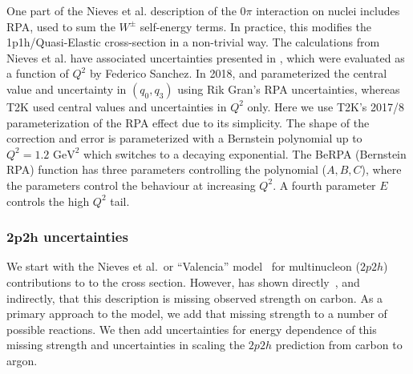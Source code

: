 One part of the Nieves et al.\cite{nieves1,nieves2} description of the $0\pi$ interaction on nuclei includes RPA, used to sum the $W^\pm$ self-energy terms. In practice, this modifies the 1p1h/Quasi-Elastic cross-section in a non-trivial way. The calculations from Nieves et al. have associated uncertainties presented in \cite{nieves_uncert}, which were evaluated as a function of $Q^2$ by Federico Sanchez. In 2018, \minerva and \nova parameterized the central value and uncertainty in $(q_0, q_3)$ using Rik Gran's RPA uncertainties\cite{RikRPA}, whereas T2K used central values and uncertainties in $Q^2$ only. Here we use T2K's 2017/8 parameterization of the RPA effect\cite{t2k_2018} due to its simplicity. The shape of the correction and error is parameterized with a Bernstein polynomial up to $Q^2=1.2\text{ GeV}^2$ which switches to a decaying exponential. The BeRPA (Bernstein RPA) function has three parameters controlling the polynomial ($A, B, C$), where the parameters control the behaviour at increasing $Q^2$. A fourth parameter $E$ controls the high $Q^2$ tail.

\subsubsection{$\boldsymbol{2p2h}$ uncertainties}
We start with the Nieves et al.\ or ``Valencia'' model~\cite{nieves1,nieves2} for multinucleon ($2p2h$) contributions to to the cross section.  However, \minerva has shown directly~\cite{Rodrigues:2015hik}, and \nova indirectly, that this description is missing observed strength on carbon.  As a primary approach to the model, we add that missing strength to a number of possible reactions.  We then add uncertainties for energy dependence of this missing strength and uncertainties in scaling the $2p2h$ prediction from carbon to argon.

